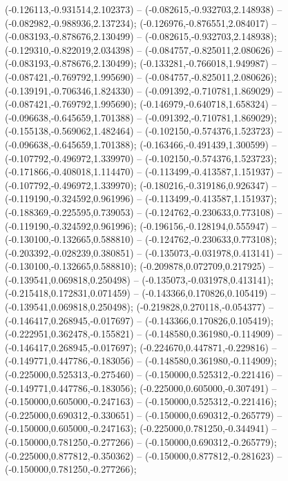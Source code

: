  (-0.126113,-0.931514,2.102373) -- (-0.082615,-0.932703,2.148938) -- (-0.082982,-0.988936,2.137234);
 (-0.126976,-0.876551,2.084017) -- (-0.083193,-0.878676,2.130499) -- (-0.082615,-0.932703,2.148938);
 (-0.129310,-0.822019,2.034398) -- (-0.084757,-0.825011,2.080626) -- (-0.083193,-0.878676,2.130499);
 (-0.133281,-0.766018,1.949987) -- (-0.087421,-0.769792,1.995690) -- (-0.084757,-0.825011,2.080626);
 (-0.139191,-0.706346,1.824330) -- (-0.091392,-0.710781,1.869029) -- (-0.087421,-0.769792,1.995690);
 (-0.146979,-0.640718,1.658324) -- (-0.096638,-0.645659,1.701388) -- (-0.091392,-0.710781,1.869029);
 (-0.155138,-0.569062,1.482464) -- (-0.102150,-0.574376,1.523723) -- (-0.096638,-0.645659,1.701388);
 (-0.163466,-0.491439,1.300599) -- (-0.107792,-0.496972,1.339970) -- (-0.102150,-0.574376,1.523723);
 (-0.171866,-0.408018,1.114470) -- (-0.113499,-0.413587,1.151937) -- (-0.107792,-0.496972,1.339970);
 (-0.180216,-0.319186,0.926347) -- (-0.119190,-0.324592,0.961996) -- (-0.113499,-0.413587,1.151937);
 (-0.188369,-0.225595,0.739053) -- (-0.124762,-0.230633,0.773108) -- (-0.119190,-0.324592,0.961996);
 (-0.196156,-0.128194,0.555947) -- (-0.130100,-0.132665,0.588810) -- (-0.124762,-0.230633,0.773108);
 (-0.203392,-0.028239,0.380851) -- (-0.135073,-0.031978,0.413141) -- (-0.130100,-0.132665,0.588810);
 (-0.209878,0.072709,0.217925) -- (-0.139541,0.069818,0.250498) -- (-0.135073,-0.031978,0.413141);
 (-0.215418,0.172831,0.071459) -- (-0.143366,0.170826,0.105419) -- (-0.139541,0.069818,0.250498);
 (-0.219828,0.270118,-0.054377) -- (-0.146417,0.268945,-0.017697) -- (-0.143366,0.170826,0.105419);
 (-0.222951,0.362478,-0.155821) -- (-0.148580,0.361980,-0.114909) -- (-0.146417,0.268945,-0.017697);
 (-0.224670,0.447871,-0.229816) -- (-0.149771,0.447786,-0.183056) -- (-0.148580,0.361980,-0.114909);
 (-0.225000,0.525313,-0.275460) -- (-0.150000,0.525312,-0.221416) -- (-0.149771,0.447786,-0.183056);
 (-0.225000,0.605000,-0.307491) -- (-0.150000,0.605000,-0.247163) -- (-0.150000,0.525312,-0.221416);
 (-0.225000,0.690312,-0.330651) -- (-0.150000,0.690312,-0.265779) -- (-0.150000,0.605000,-0.247163);
 (-0.225000,0.781250,-0.344941) -- (-0.150000,0.781250,-0.277266) -- (-0.150000,0.690312,-0.265779);
 (-0.225000,0.877812,-0.350362) -- (-0.150000,0.877812,-0.281623) -- (-0.150000,0.781250,-0.277266);
